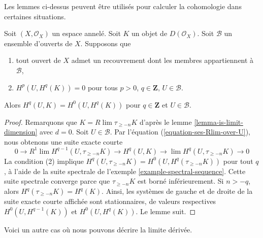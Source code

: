 \noindent
Les lemmes ci-dessus peuvent être utilisés pour calculer la cohomologie dans certaines situations.

\begin{lemma}

\label{lemma-cohomology-over-U-trivial}

Soit $(X, \mathcal{O}_X)$ un espace annelé. Soit $K$
un objet de $D(\mathcal{O}_X)$. Soit $\mathcal{B}$ un ensemble d'ouverts de $X$. Supposons que

\begin{enumerate}

\item tout ouvert de $X$ admet un recouvrement dont les membres appartiennent à $\mathcal{B}$,
\item  $H^p(U, H^q(K)) = 0$ pour tous $p > 0$, $q \in \mathbf{Z}$,
$U \in \mathcal{B}$.

\end{enumerate}

Alors $H^q(U, K) = H^0(U, H^q(K))$ pour $q \in \mathbf{Z}$
et $U \in \mathcal{B}$.

\end{lemma}

\begin{proof}

Remarquons que $K = R\lim \tau_{\geq -n} K$ d'après le lemme \ref{lemma-is-limit-dimension} avec $d = 0$. Soit $U \in \mathcal{B}$. Par l'équation (\ref{equation-ses-Rlim-over-U}), nous obtenons une suite exacte courte
$$
0 \to R^1\lim H^{q - 1}(U, \tau_{\geq -n}K) \to
H^q(U, K) \to \lim H^q(U, \tau_{\geq -n}K) \to 0
$$
La condition (2) implique
$H^q(U, \tau_{\geq -n} K) = H^0(U, H^q(\tau_{\geq -n} K))$
pour tout $q$, à l'aide de la suite spectrale de l'exemple \ref{example-spectral-sequence}. Cette suite spectrale converge parce que $\tau_{\geq -n}K$ est borné inférieurement. Si $n > -q$, alors $H^q(\tau_{\geq -n}K) = H^q(K)$. Ainsi, les systèmes de gauche et de droite de la suite exacte courte affichée sont stationnaires, de valeurs respectives
$H^0(U, H^{q - 1}(K))$ et $H^0(U, H^q(K))$. Le lemme suit.

\end{proof}

\noindent
Voici un autre cas où nous pouvons décrire la limite dérivée.

